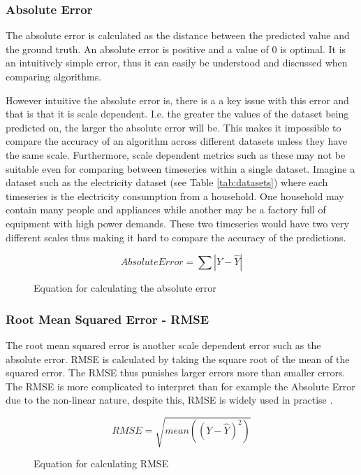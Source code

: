 \subsubsection{Absolute Error}
The absolute error is calculated as the distance between the predicted value and the ground truth. An absolute error is positive and a value of 0 is optimal. It is an intuitively simple error, thus it can easily be understood and discussed when comparing algorithms.

However intuitive the absolute error is, there is a a key issue with this error and that is that it is scale dependent. I.e. the greater the values of the dataset being predicted on, the larger the absolute error will be. This makes it impossible to compare the accuracy of an algorithm across different datasets unless they have the same scale. \cite{hyndman_forecasting_3rd} Furthermore, scale dependent metrics such as these may not be suitable even for comparing between timeseries within a single dataset. Imagine a dataset such as the electricity dataset (see Table \ref{tab:datasets}) where each timeseries is the electricity consumption from a household. One household may contain many people and appliances while another may be a factory full of equipment with high power demands. These two timeseries would have two very different scales thus making it hard to compare the accuracy of the predictions.

\begin{figure}[h]
  \[Absolute Error = \sum|Y - \hat{Y}|\]
  \caption{Equation for calculating the absolute error}
  \label{eq:abs_error}
\end{figure}

\subsubsection{Root Mean Squared Error - RMSE}
\label{sec:RMSE}
The root mean squared error is another scale dependent error such as the absolute error. RMSE is calculated by taking the square root of the mean of the squared error. The RMSE thus punishes larger errors more than smaller errors. The RMSE is more complicated to interpret than for example the Absolute Error due to the non-linear nature, despite this, RMSE is widely used in practise \cite{hyndman_forecasting_3rd,gluonts-github}.

\begin{figure}[h]
  \[RMSE = \sqrt{mean((Y - \hat{Y})^2)}\]
  \caption{Equation for calculating RMSE}
  \label{eq:RMSE}
\end{figure}

